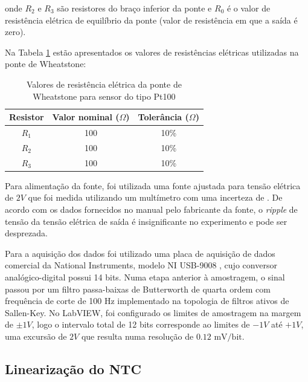 \documentclass[a4paper]{instrumentacao}
\begin{document}
\noindent onde $R_2$ e $R_3$ são resistores do braço inferior da ponte e $R_0$ é o valor de resistência elétrica de equilíbrio da ponte (valor de resistência em que a saída é zero).


Na Tabela \ref{tab:pt100-ponte-resistores} estão apresentados os valores de resistências elétricas utilizadas na ponte de Wheatstone:

\begin{table}[H]
\centering
\caption{Valores de resistência elétrica da ponte de Wheatstone para sensor do tipo Pt100}
\label{tab:pt100-ponte-resistores}
\begin{tabular}{|c|c|c|}
\hline
	\textbf{Resistor} 	& \textbf{Valor nominal ($\Omega$)} 	& \textbf{Tolerância ($\Omega$)} 	\\ \hline
	$R_1$				& 100									& 10\%								\\ \hline
	$R_2$				& 100									& 10\%								\\ \hline
	$R_3$				& 100									& 10\%								\\ \hline
\end{tabular}
\end{table}

Para alimentação da fonte, foi utilizada uma fonte  ajustada para tensão elétrica de $2V$ que foi medida utilizando um multímetro  com uma incerteza de . De acordo com os dados fornecidos no manual pelo fabricante da fonte, o \textit{ripple} de tensão da tensão elétrica de saída é insignificante no experimento e pode ser desprezada.

Para a aquisição dos dados foi utilizado uma placa de aquisição de dados comercial da National Instruments, modelo NI USB-9008 , cujo conversor analógico-digital possui 14 bits. Numa etapa anterior à amostragem, o sinal passou por um filtro passa-baixas de Butterworth de quarta ordem com frequência de corte de 100 Hz implementado na topologia de filtros ativos de Sallen-Key. No LabVIEW, foi configurado os limites de amostragem na margem de $\pm 1V$, logo o intervalo total de 12 bits corresponde ao limites de $-1V$ até $+1V$, uma excursão de $2V$ que resulta numa resolução de $0.12\text{ mV/bit}$.

\subsection{Linearização do NTC}
\label{sec:ntc-linearizacao}
\end{document}
